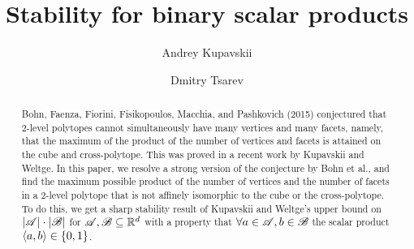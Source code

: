 

\title{\textbf{Stability for binary scalar products}}
\author[1,2]{Andrey Kupavskii}
\author[3]{Dmitry Tsarev}
\date{}



\maketitle

\begin{abstract}
    Bohn, Faenza, Fiorini, Fisikopoulos, Macchia, and Pashkovich (2015) conjectured that 2-level polytopes cannot simultaneously have many vertices and many facets, namely, that the maximum of the product of the number of vertices and facets is attained on the cube and cross-polytope. This was proved in a recent work by Kupavskii and Weltge. In this paper, we resolve a strong version of the conjecture by Bohn et al., and find the maximum possible product of the number of vertices and the number of facets in a 2-level polytope that is not affinely isomorphic to the cube or the cross-polytope. To do this, we get a sharp  stability result of Kupavskii and Weltge's upper bound on $\left|{\mathscr{A}}\right|\cdot\left|{\mathscr{B}}\right|$ for ${\mathscr{A}},{\mathscr{B}} \subseteq {\mathbb{R}}^d$ with a property that $\forall a \in {\mathscr{A}}, b \in {\mathscr{B}}$ the scalar product $\langle a, b\rangle \in\{0,1\}$.
\end{abstract}







\nocite{*}




